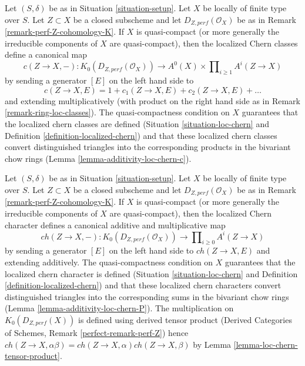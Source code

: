 \begin{remark}
\label{remark-localized-chern-classes-K}
Let $(S, \delta)$ be as in Situation \ref{situation-setup}.
Let $X$ be locally of finite type over $S$.
Let $Z \subset X$ be a closed subscheme and let
$D_{Z, perf}(\mathcal{O}_X)$ be as in
Remark \ref{remark-perf-Z-cohomology-K}.
If $X$ is quasi-compact (or more generally the irreducible
components of $X$ are quasi-compact), then
the localized Chern classes define a canonical map
$$
c(Z \to X, -) : K_0(D_{Z, perf}(\mathcal{O}_X)) \longrightarrow
A^0(X) \times \prod\nolimits_{i \geq 1} A^i(Z \to X)
$$
by sending a generator $[E]$ on the left hand side to
$$
c(Z \to X, E) = 1 + c_1(Z \to X, E) + c_2(Z \to X, E) + \ldots
$$
and extending multiplicatively (with product on the right hand
side as in Remark \ref{remark-ring-loc-classes}).
The quasi-compactness condition on $X$ guarantees that the
localized chern classes are defined (Situation \ref{situation-loc-chern} and
Definition \ref{definition-localized-chern})
and that these localized chern classes convert distinguished triangles into
the corresponding products in the bivariant chow rings
(Lemma \ref{lemma-additivity-loc-chern-c}).
\end{remark}

\begin{remark}
\label{remark-localized-chern-character-K}
Let $(S, \delta)$ be as in Situation \ref{situation-setup}.
Let $X$ be locally of finite type over $S$.
Let $Z \subset X$ be a closed subscheme and let
$D_{Z, perf}(\mathcal{O}_X)$ be as in
Remark \ref{remark-perf-Z-cohomology-K}.
If $X$ is quasi-compact (or more generally the irreducible
components of $X$ are quasi-compact), then
the localized Chern character defines a canonical additive
and multiplicative map
$$
ch(Z \to X, -) : K_0(D_{Z, perf}(\mathcal{O}_X)) \longrightarrow
\prod\nolimits_{i \geq 0} A^i(Z \to X)
$$
by sending a generator $[E]$ on the left hand side to
$ch(Z \to X, E)$ and extending additively.
The quasi-compactness condition on $X$ guarantees that the
localized chern character is defined (Situation \ref{situation-loc-chern} and
Definition \ref{definition-localized-chern})
and that these localized chern characters
convert distinguished triangles into the corresponding
sums in the bivariant chow rings
(Lemma \ref{lemma-additivity-loc-chern-P}).
The multiplication on
$K_0(D_{Z, perf}(X))$ is defined using derived tensor product
(Derived Categories of Schemes, Remark \ref{perfect-remark-perf-Z})
hence $ch(Z \to X, \alpha \beta) = ch(Z \to X, \alpha) ch(Z \to X, \beta)$ by
Lemma \ref{lemma-loc-chern-tensor-product}.
\end{remark}

